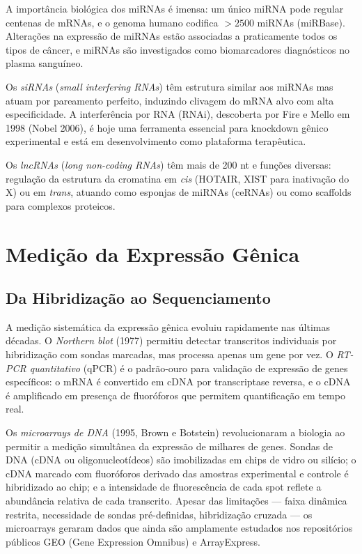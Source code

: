 A importância biológica dos miRNAs é imensa: um único miRNA pode regular centenas de
mRNAs, e o genoma humano codifica $>2500$ miRNAs (miRBase). Alterações na expressão de
miRNAs estão associadas a praticamente todos os tipos de câncer, e miRNAs são
investigados como biomarcadores diagnósticos no plasma sanguíneo.

Os \emph{siRNAs} (\textit{small interfering RNAs}) têm estrutura similar aos miRNAs mas
atuam por pareamento perfeito, induzindo clivagem do mRNA alvo com alta especificidade.
A interferência por RNA (RNAi), descoberta por Fire e Mello em 1998 (Nobel 2006), é hoje
uma ferramenta essencial para knockdown gênico experimental e está em desenvolvimento como
plataforma terapêutica.

Os \emph{lncRNAs} (\textit{long non-coding RNAs}) têm mais de 200 nt e funções diversas:
regulação da estrutura da cromatina em \textit{cis} (HOTAIR, XIST para inativação do X) ou
em \textit{trans}, atuando como esponjas de miRNAs (ceRNAs) ou como scaffolds para
complexos proteicos.


\section{Medição da Expressão Gênica}

\subsection{Da Hibridização ao Sequenciamento}

A medição sistemática da expressão gênica evoluiu rapidamente nas últimas décadas. O
\emph{Northern blot} (1977) permitiu detectar transcritos individuais por hibridização com
sondas marcadas, mas processa apenas um gene por vez. O \emph{RT-PCR quantitativo} (qPCR)
é o padrão-ouro para validação de expressão de genes específicos: o mRNA é convertido em
cDNA por transcriptase reversa, e o cDNA é amplificado em presença de fluoróforos que
permitem quantificação em tempo real.

Os \emph{microarrays de DNA} (1995, Brown e Botstein) revolucionaram a biologia ao permitir
a medição simultânea da expressão de milhares de genes. Sondas de DNA (cDNA ou
oligonucleotídeos) são imobilizadas em chips de vidro ou silício; o cDNA marcado com
fluoróforos derivado das amostras experimental e controle é hibridizado ao chip; e a
intensidade de fluorescência de cada spot reflete a abundância relativa de cada transcrito.
Apesar das limitações --- faixa dinâmica restrita, necessidade de sondas pré-definidas,
hibridização cruzada --- os microarrays geraram dados que ainda são amplamente estudados
nos repositórios públicos GEO (Gene Expression Omnibus) e ArrayExpress.

